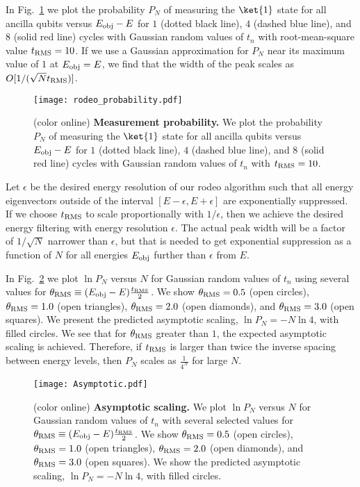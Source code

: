 In Fig.~\ref{rodeo_probability} we plot the probability $P_N$ of measuring the $\ket{1}$ state for all ancilla qubits versus $E_{\rm obj}-E$ for $1$ (dotted black line), $4$ (dashed blue line), and $8$ (solid red line) cycles with Gaussian random values of $t_n$ with root-mean-square value $t_{\rm RMS}=10$.  If we use a Gaussian approximation for $P_N$ near its maximum value of $1$ at $E_{\rm obj}=E$, we find that the width of the peak scales as $O[1/(\sqrt{N}t_{\rm RMS})]$.
\begin{figure}
\centering
\texttt{[image: rodeo\_probability.pdf]}
\caption{(color online) {\bf Measurement probability.} We plot the probability $P_N$ of measuring the $\ket{1}$ state for all ancilla qubits versus $E_{\rm obj}-E$ for $1$ (dotted black line), $4$ (dashed blue line), and $8$ (solid red line) cycles with Gaussian random values of $t_n$ with $t_{\rm RMS}=10$.}
\label{rodeo_probability}
\end{figure} 

Let $\epsilon$ be the desired energy resolution of our rodeo algorithm such that all energy eigenvectors outside of the interval $[E-\epsilon, E+\epsilon]$ are exponentially suppressed.  If we choose $t_{\rm RMS}$ to scale proportionally with $1/\epsilon$, then we achieve the desired energy filtering with energy resolution $\epsilon$.  The actual peak width will be a factor of $1/\sqrt{N}$ narrower than $\epsilon$, but that is needed to get exponential suppression as a function of $N$ for all energies $E_{\rm obj}$ further than $\epsilon$ from $E$.  

In Fig.~\ref{asymptotic} we plot $\ln P_N$ versus $N$ for Gaussian random values of $t_n$ using several values for $\theta_{\rm RMS}\equiv(E_{\rm obj}-E)\tfrac{t_{\rm RMS}}{2}$.  We show $\theta_{\rm RMS}=0.5$ (open circles), $\theta_{\rm RMS}=1.0$ (open triangles), $\theta_{\rm RMS}=2.0$ (open diamonds), and $\theta_{\rm RMS}=3.0$ (open squares). We present the predicted asymptotic scaling, $\ln P_N = -N \ln 4$, with filled circles.  We see that for $\theta_{\rm RMS}$ greater than $1$, the expected asymptotic scaling is achieved.  Therefore, if $t_{\rm RMS}$ is larger than twice the inverse spacing between energy levels, then $P_N$ scales as $\tfrac{1}{4^N}$ for large $N$.

\begin{figure}
\centering
\texttt{[image: Asymptotic.pdf]}
\caption{(color online) {\bf Asymptotic scaling.} We plot $\ln P_N$ versus $N$ for Gaussian random values of $t_n$ with several selected values for $\theta_{\rm RMS}\equiv(E_{\rm obj}-E)\tfrac{t_{\rm RMS}}{2}$.  We show $\theta_{\rm RMS}=0.5$ (open circles), $\theta_{\rm RMS}=1.0$ (open triangles), $\theta_{\rm RMS}=2.0$ (open diamonds), and $\theta_{\rm RMS}=3.0$ (open squares). We show the predicted asymptotic scaling, $\ln P_N = -N \ln 4$, with filled circles.}
\label{asymptotic}
\end{figure} 

